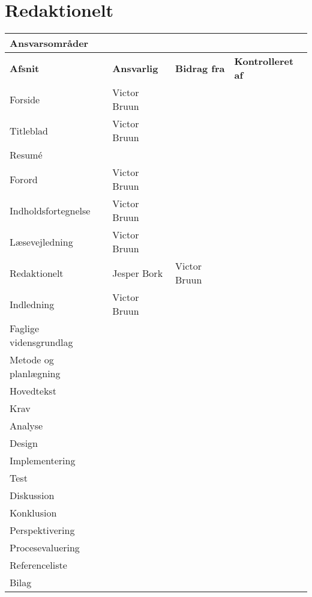 \clearpage
\section{Redaktionelt}

\begin{table}[h!]
\centering
\label{tab:1}
    \begin{tabular}{|p{40mm}|p{30mm}|p{30mm}|p{30mm}|} \hline
    \multicolumn{4}{|l|}{\textbf{Ansvarsområder}} \\ \hline
        \textbf{Afsnit}        & \textbf{Ansvarlig} & \textbf{Bidrag fra} &\textbf{Kontrolleret af}  \\\hline
        Forside                & Victor Bruun     &          &  \\ \hline
        Titleblad              & Victor Bruun     &          &  \\ \hline
        Resumé                 &                  &          &  \\ \hline
        Forord                 & Victor Bruun     &          &  \\ \hline
        Indholdsfortegnelse    & Victor Bruun     &          &  \\ \hline
        Læsevejledning         & Victor Bruun     &          &  \\ \hline
        Redaktionelt           & Jesper Bork      & Victor Bruun         &  \\ \hline
        Indledning             & Victor Bruun     &          &  \\ \hline
        Faglige vidensgrundlag &                  &          &  \\ \hline
        Metode og planlægning  &                  &          &  \\ \hline
        Hovedtekst             &                  &          &  \\ \hline
        Krav                   &                  &          &  \\ \hline
        Analyse                &                  &          &  \\ \hline
        Design                 &                  &          &  \\ \hline
        Implementering         &                  &          &  \\ \hline
        Test                   &                  &          &  \\ \hline
        Diskussion             &                  &          &  \\ \hline
        Konklusion             &                  &          &  \\ \hline
        Perspektivering        &                  &          &  \\ \hline
        Procesevaluering       &                  &          &  \\ \hline
        Referenceliste         &                  &          &  \\ \hline
        Bilag                  &                  &          &  \\ \hline
    \end{tabular}
\end{table}

\clearpage